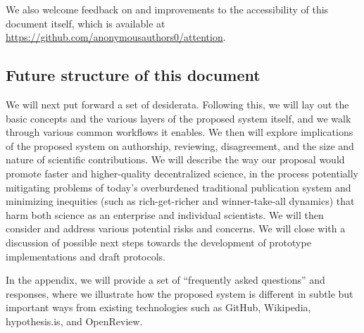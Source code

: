 \documentclass{article} %
\begin{document}
We also welcome feedback on and improvements to the accessibility of this document itself, which is available at 
\url{https://github.com/anonymousauthors0/attention}.



\subsection{Future structure of this document}
\label{structure}
We will next 
put forward
a set of desiderata.
Following this, we will lay out the basic concepts and the various layers of the proposed system itself,
and we walk through various common workflows it enables.
We then will explore 
implications of the proposed system on 
authorship, 
reviewing, 
disagreement, 
and the size and nature of scientific contributions.
We will describe the way our proposal would promote faster and higher-quality decentralized science, in the process potentially mitigating problems of today's overburdened traditional publication system and minimizing inequities (such as rich-get-richer and winner-take-all dynamics) that harm both science as an enterprise and individual scientists.
We will then consider and address
various potential risks and concerns.
We will close with a discussion of possible next steps towards the development of prototype implementations and draft protocols.

In
the appendix, we will provide a set of ``frequently asked questions'' and responses, where 
we illustrate how the proposed system is different in subtle but important ways from
existing technologies
such as GitHub, Wikipedia, hypothesis.is, and OpenReview.


\end{document}
